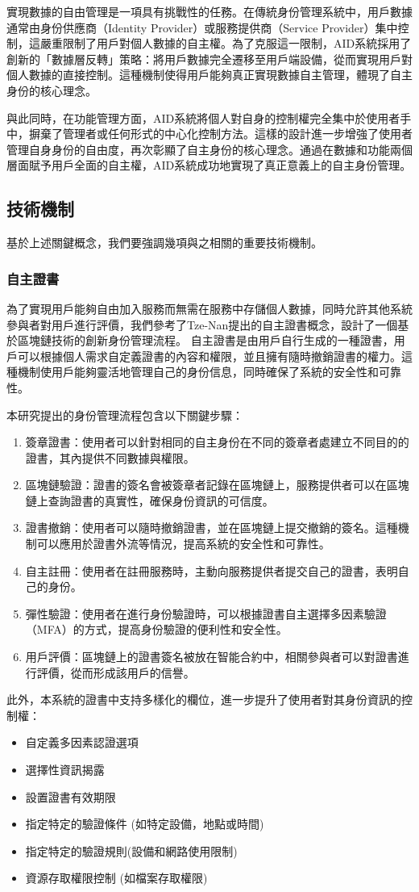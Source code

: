 實現數據的自由管理是一項具有挑戰性的任務。在傳統身份管理系統中，用戶數據通常由身份供應商（Identity Provider）或服務提供商（Service Provider）集中控制，這嚴重限制了用戶對個人數據的自主權。為了克服這一限制，AID系統採用了創新的「數據層反轉」策略：將用戶數據完全遷移至用戶端設備，從而實現用戶對個人數據的直接控制。這種機制使得用戶能夠真正實現數據自主管理，體現了自主身份的核心理念。

與此同時，在功能管理方面，AID系統將個人對自身的控制權完全集中於使用者手中，摒棄了管理者或任何形式的中心化控制方法。這樣的設計進一步增強了使用者管理自身身份的自由度，再次彰顯了自主身份的核心理念。通過在數據和功能兩個層面賦予用戶全面的自主權，AID系統成功地實現了真正意義上的自主身份管理。
\subsection{技術機制}
基於上述關鍵概念，我們要強調幾項與之相關的重要技術機制。
\subsubsection{自主證書}
為了實現用戶能夠自由加入服務而無需在服務中存儲個人數據，同時允許其他系統參與者對用戶進行評價，我們參考了Tze-Nan\cite{NTU202102846}提出的自主證書概念，設計了一個基於區塊鏈技術的創新身份管理流程。
自主證書是由用戶自行生成的一種證書，用戶可以根據個人需求自定義證書的內容和權限，並且擁有隨時撤銷證書的權力。這種機制使用戶能夠靈活地管理自己的身份信息，同時確保了系統的安全性和可靠性。

本研究提出的身份管理流程包含以下關鍵步驟：
\begin{enumerate}
  \item 簽章證書：使用者可以針對相同的自主身份在不同的簽章者處建立不同目的的證書，其內提供不同數據與權限。
  \item 區塊鏈驗證：證書的簽名會被簽章者記錄在區塊鏈上，服務提供者可以在區塊鏈上查詢證書的真實性，確保身份資訊的可信度。
  \item 證書撤銷：使用者可以隨時撤銷證書，並在區塊鏈上提交撤銷的簽名。這種機制可以應用於證書外流等情況，提高系統的安全性和可靠性。
  \item 自主註冊：使用者在註冊服務時，主動向服務提供者提交自己的證書，表明自己的身份。
  \item 彈性驗證：使用者在進行身份驗證時，可以根據證書自主選擇多因素驗證（MFA）的方式，提高身份驗證的便利性和安全性。
  \item 用戶評價：區塊鏈上的證書簽名被放在智能合約中，相關參與者可以對證書進行評價，從而形成該用戶的信譽。
\end{enumerate}
此外，本系統的證書中支持多樣化的欄位，進一步提升了使用者對其身份資訊的控制權：
\begin{itemize}
  \item 自定義多因素認證選項
  \item 選擇性資訊揭露
  \item 設置證書有效期限
  \item 指定特定的驗證條件 (如特定設備，地點或時間)
  \item 指定特定的驗證規則(設備和網路使用限制)
  \item 資源存取權限控制 (如檔案存取權限)
\end{itemize}

